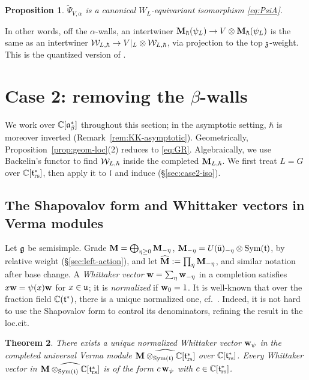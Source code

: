 \documentclass{article}
\theoremstyle{plain}
\newtheorem{theorem}{Theorem}[section]
\newtheorem{proposition}[theorem]{Proposition}
\theoremstyle{definition}
\theoremstyle{remark}
\numberwithin{equation}{section}
\begin{document}
\begin{proposition}\label{prop:PsiA}
$\widetilde\Psi_{V,\alpha}$ is a canonical $W_L$-equivariant isomorphism \eqref{eq:PsiA}.
\end{proposition}

In other words, off the $\alpha$-walls, an intertwiner $\mathbf{M}_\hbar(\psi_L)\to V\otimes\mathbf{M}_\hbar(\psi_L)$ is the same as an intertwiner $\mathcal{W}_{L,\hbar}\to V|_L\otimes\mathcal{W}_{L,\hbar}$, via projection to the top $\mathfrak{z}$-weight. This is the quantized version of \cite[Corollary 3.3.10]{macerato2023leviequivariantrestrictionsphericalperverse}.


\section{Case 2: removing the \texorpdfstring{$\beta$}{beta}-walls}\label{sec:case2}

We work over $\mathbb{C}[\mathfrak{a}^*_{\beta}]$ throughout this section; in the asymptotic setting, $\hbar$ is moreover inverted (Remark~\ref{rem:KK-asymptotic}). Geometrically, Proposition~\ref{prop:geom-loc}(2) reduces to \eqref{eq:GR}. Algebraically, we use Backelin's functor to find $\mathcal{W}_{L,\hbar}$ inside the completed $\mathbf{M}_{L,\hbar}$. We first treat $L=G$ over $\mathbb{C}[\mathfrak{t}^*_{\mathrm{rs}}]$, then apply it to $\mathfrak{l}$ and induce (\S\ref{sec:case2-iso}).

\subsection{The Shapovalov form and Whittaker vectors in Verma modules}\label{sec:shapovalov}
Let $\mathfrak{g}$ be semisimple. Grade $\mathbf{M}=\bigoplus_{\eta\geq0}\mathbf{M}_{-\eta}$, $\mathbf{M}_{-\eta}=U(\bar{\mathfrak{u}})_{-\eta}\otimes \operatorname{Sym}(\mathfrak{t})$, by relative weight (\S\ref{sec:left-action}), and let $\widehat{\mathbf{M}}:=\prod_\eta\mathbf{M}_{-\eta}$, and similar notation after base change. A \emph{Whittaker vector} $\mathbf w=\sum_\eta\mathbf w_{-\eta}$ in a completion satisfies $x\mathbf w=\psi(x)\mathbf w$ for $x\in\mathfrak{u}$; it is \emph{normalized} if $\mathbf w_0=1$. It is well-known that over the fraction field $\mathbb{C}(\mathfrak{t}^*)$, there is a unique normalized one, cf.\ \cite[\S8]{braverman2016instantonmodulispacesmathscr}. Indeed, it is not hard to use the Shapovalov form to control its denominators, refining the result in the loc.cit.

\begin{theorem}\label{thm:whittaker-vector}
There exists a unique normalized Whittaker vector $\mathbf w_\psi$ in the completed universal Verma module $\widehat{\mathbf{M}\otimes_{\operatorname{Sym}(\mathfrak{t})}\mathbb{C}[\mathfrak{t}^*_{\mathrm{rs}}]}$ over $\mathbb{C}[\mathfrak{t}^*_{\mathrm{rs}}]$. Every Whittaker vector in $\widehat{\mathbf{M}\otimes_{\operatorname{Sym}(\mathfrak{t})}\mathbb{C}[\mathfrak{t}^*_{\mathrm{rs}}]}$ is of the form $c\,\mathbf w_\psi$ with $c\in\mathbb{C}[\mathfrak{t}^*_{\mathrm{rs}}]$.
\end{theorem}
\end{document}

